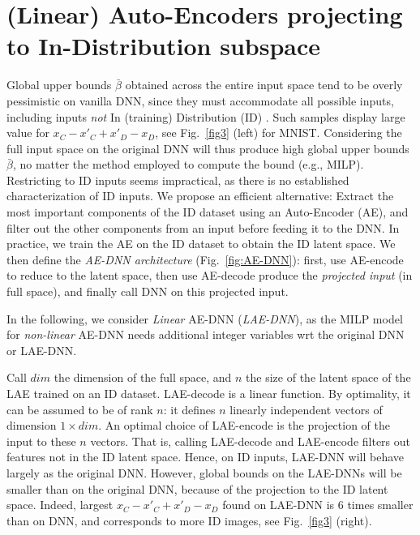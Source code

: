 \section{(Linear) Auto-Encoders projecting to  In-Distribution subspace}

\label{sec.pca}

Global upper bounds $\bar{\beta}$ obtained across the entire input space tend to be overly pessimistic on vanilla DNN, since they must accommodate all possible inputs, including inputs {\em not} In (training) Distribution (ID) \cite{OOD}. Such samples display large value for 
$x_C - x'_C + x'_D - x_D$, see Fig.~\ref{fig3} (left) for MNIST.
Considering the full input space on the original DNN will thus produce high global upper bounds $\bar{\beta}$, no matter the method employed to compute the bound (e.g., MILP). Restricting to ID inputs seems impractical, as there is no established characterization of ID inputs. We propose an efficient alternative:
Extract the most important components of the ID dataset using an Auto-Encoder (AE), and filter out the other components from an input before feeding it to the DNN. In practice, we train the AE on the ID dataset to obtain the ID latent space. We then define the {\em AE-DNN architecture} (Fig.~\ref{fig:AE-DNN}): first, use AE-encode to reduce to the latent space, then use AE-decode 
produce the {\em projected input} (in full space), 
and finally call DNN on this projected input. 

%
In the following, we consider {\em Linear} AE-DNN ({\em LAE-DNN}), as the MILP model for {\em non-linear} AE-DNN needs additional integer variables wrt the original DNN or LAE-DNN.

Call $dim$ the dimension of the full space, and $n$ the size of the latent space of the LAE trained on an ID dataset. LAE-decode is a linear function. By optimality, it can be assumed to be of rank $n$: it defines $n$ linearly independent vectors of dimension $1 \times dim$.
An optimal choice of LAE-encode is the projection of the input to these $n$ vectors. That is, calling LAE-decode and LAE-encode filters out features not in the ID latent space.
Hence, on ID inputs, LAE-DNN will behave largely as the original DNN. However, global bounds on the LAE-DNNs will be smaller than on the original DNN, because of the projection to the ID latent space.
Indeed, largest $x_C - x'_C + x'_D - x_D$ found 
on LAE-DNN is 6 times smaller than on DNN, and corresponds to more ID images, see Fig.~\ref{fig3} (right).



